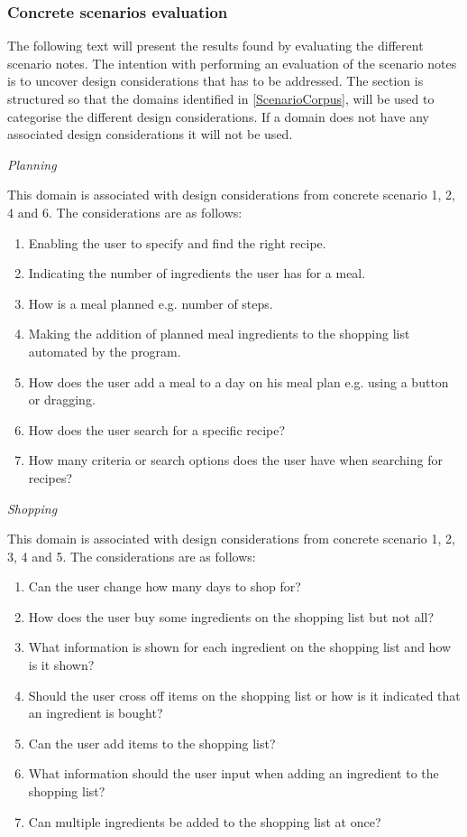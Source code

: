 \subsubsection{Concrete scenarios evaluation} 
The following text will present the results found by evaluating the different scenario notes. The intention with performing an evaluation of the scenario notes is to uncover design considerations that has to be addressed. The section is structured so that the domains identified in \cref{ScenarioCorpus}, will be used to categorise the different design considerations. If a domain does not have any associated design considerations it will not be used.  

\emph{Planning}

This domain is associated with design considerations from concrete scenario 1, 2, 4 and 6. The considerations are as follows:

\begin{enumerate}
	\item Enabling the user to specify and find the right recipe.	
	\item Indicating the number of ingredients the user has for a meal.
	\item How is a meal planned e.g. number of steps.
	\item Making the addition of planned meal ingredients to the shopping list automated by the program.
	\item How does the user add a meal to a day on his meal plan e.g. using a button or dragging.
	\item How does the user search for a specific recipe?
	\item How many criteria or search options does the user have when searching for recipes?
\end{enumerate}

\emph{Shopping}

This domain is associated with design considerations from concrete scenario 1, 2, 3, 4 and 5. The considerations are as follows:

\begin{enumerate}
	\item Can the user change how many days to shop for?
	\item How does the user buy some ingredients on the shopping list but not all?
	\item What information is shown for each ingredient on the shopping list and how is it shown?
	\item Should the user cross off items on the shopping list or how is it indicated that an ingredient is bought?
	\item Can the user add items to the shopping list?
	\item What information should the user input when adding an ingredient to the shopping list?
	\item Can multiple ingredients be added to the shopping list at once?   
\end{enumerate}

